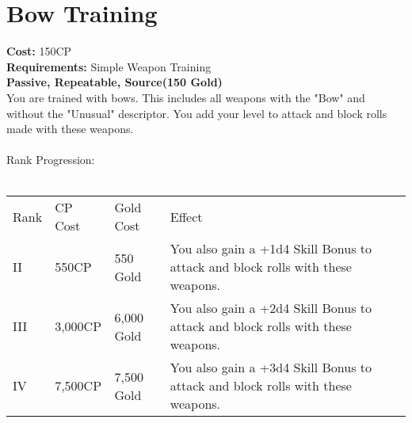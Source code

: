 \section{Bow Training}\label{perk:bowTraining}
\textbf{Cost:} 150CP\\
\textbf{Requirements:} Simple Weapon Training\\
\textbf{Passive, Repeatable, Source(150 Gold)}\\
You are trained with bows.
This includes all weapons with the "Bow" and without the "Unusual" descriptor.
You add your level to attack and block rolls made with these weapons.\\
\\
Rank Progression:\\
\\
\begin{longtable}{l | l | l | p{9cm}}
	Rank & CP Cost & Gold Cost & Effect\\
	II & 550CP & 550 Gold & You also gain a +1d4 Skill Bonus to attack and block rolls with these weapons.\\
	III & 3,000CP & 6,000 Gold & You also gain a +2d4 Skill Bonus to attack and block rolls with these weapons.\\
	IV & 7,500CP & 7,500 Gold & You also gain a +3d4 Skill Bonus to attack and block rolls with these weapons.\\
\end{longtable}